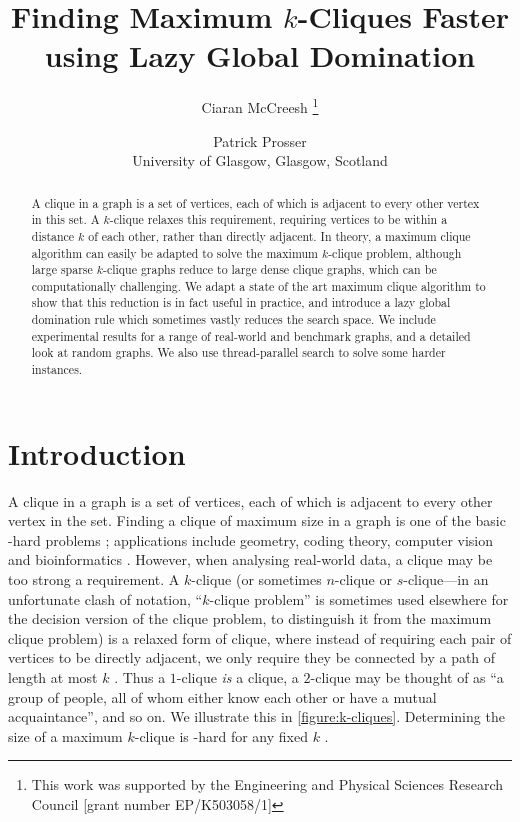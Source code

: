 \documentclass[letterpaper]{article}
\begin{document}
\title{Finding Maximum $k$-Cliques Faster using Lazy Global Domination}
 \author{
    Ciaran McCreesh%
    \thanks{This work was supported by the Engineering and Physical Sciences Research Council [grant number EP/K503058/1]}
    \and
    Patrick Prosser
    \\ University of Glasgow, Glasgow, Scotland
}
\maketitle

\begin{abstract}
    A clique in a graph is a set of vertices, each of which is adjacent to every other vertex in
    this set. A $k$-clique relaxes this requirement, requiring vertices to be within a distance $k$
    of each other, rather than directly adjacent. In theory, a maximum clique algorithm can easily
    be adapted to solve the maximum $k$-clique problem, although large sparse $k$-clique graphs
    reduce to large dense clique graphs, which can be computationally challenging. We adapt a state of
    the art maximum clique algorithm to show that this reduction is in fact useful in practice, and
    introduce a lazy global domination rule which sometimes vastly reduces the search space. We
    include experimental results for a range of real-world and benchmark graphs, and a detailed look
    at random graphs. We also use thread-parallel search to solve some harder instances.
\end{abstract}

\section{Introduction}

A clique in a graph is a set of vertices, each of which is adjacent to every other vertex in the
set. Finding a clique of maximum size in a graph is one of the basic \NP-hard problems
\cite{Garey:1990}; applications include geometry, coding theory, computer vision and bioinformatics
\cite{Bomze:1999,Butenko:2006}. However, when analysing real-world data, a clique may be too strong
a requirement. A $k$-clique (or sometimes $n$-clique or $s$-clique---in an unfortunate clash of
notation, ``$k$-clique problem'' is sometimes used elsewhere for the decision version of the clique
problem, to distinguish it from the maximum clique problem) is a relaxed form of clique, where
instead of requiring each pair of vertices to be directly adjacent, we only require they be
connected by a path of length at most $k$ \cite{Luce:1950}.  Thus a $1$-clique \emph{is} a clique, a
$2$-clique may be thought of as ``a group of people, all of whom either know each other or have a
mutual acquaintance'', and so on. We illustrate this in \cref{figure:k-cliques}.  Determining the
size of a maximum $k$-clique is \NP-hard for any fixed $k$ \cite{Bourjolly:2002}.
\end{document}
